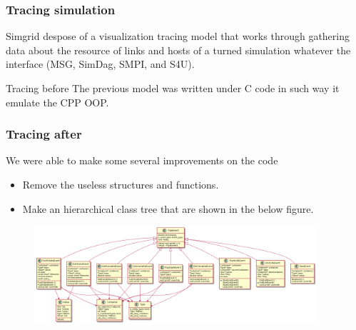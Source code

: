 \begin{frame}\frametitle{Tracing simulation}
Simgrid despose of a visualization tracing model that works through gathering data about the resource of links and hosts of a turned simulation whatever the interface (MSG, SimDag, SMPI, and S4U).\\

\begin{exampleblock}{Tracing before}
The previous model was written under C code in such way it emulate the CPP OOP.
\end{exampleblock}

\end{frame}
\begin{frame}\frametitle{Tracing after}
\begin{exampleblock}{}
We were able to make some several improvements on the code 
\begin{itemize}
\item Remove the useless structures and functions.
\item Make an hierarchical class tree that are shown in the below figure.
\end{itemize}
\end{exampleblock}
\begin{figure}
\includegraphics[width=10.5cm]{figures/diagram_simgrid.png}
\end{figure}
\end{frame}